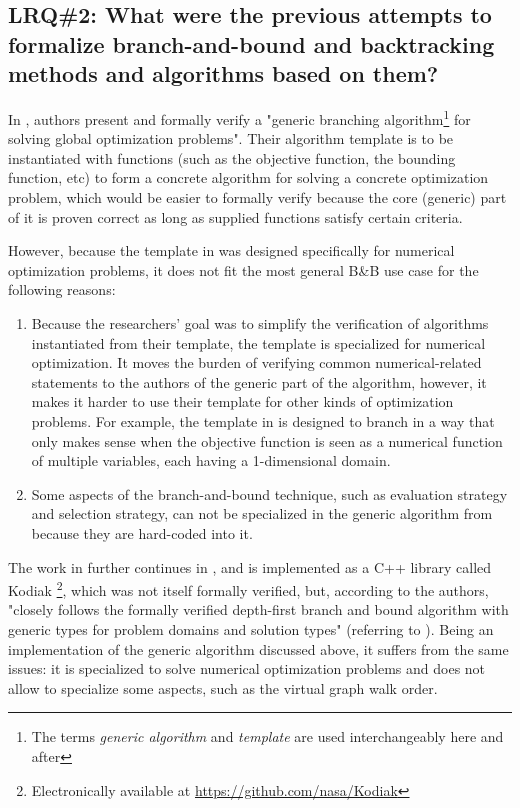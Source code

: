 \subsection{LRQ\#2: What were the previous attempts to formalize branch-and-bound and backtracking methods and algorithms based on them?}

In \cite{narkawicz2013formalnasa}, authors present and formally verify a "generic branching
algorithm\footnote{The terms \emph{generic algorithm} and \emph{template} are used interchangeably
                    here and after}
for solving global optimization problems". Their algorithm template is to be instantiated with
functions (such as the objective function, the bounding function, etc) to form a concrete
algorithm for solving a concrete optimization problem, which would be easier to formally verify
because the core (generic) part of it is proven correct as long as supplied functions
satisfy certain criteria.

However, because the template in \cite{narkawicz2013formalnasa} was designed specifically for
numerical optimization problems, it does not fit the most general B\&B use case for the following
reasons:

\begin{enumerate}
    \item Because the researchers' goal was to simplify the verification of algorithms instantiated
        from their template, the template is specialized for numerical optimization. It moves the
        burden of verifying common numerical-related statements to the authors of the generic
        part of the algorithm, however, it makes it harder to use their template for other kinds of
        optimization problems. For example, the template in \cite{narkawicz2013formalnasa}
        is designed to branch in a way that only makes sense when the objective function is seen as
        a numerical function of multiple variables, each having a 1-dimensional domain.
    \item Some aspects of the branch-and-bound technique, such as evaluation strategy
        and selection strategy, can not be specialized in the
        generic algorithm from \cite{narkawicz2013formalnasa} because they are hard-coded into it.
\end{enumerate}

The work in \cite{narkawicz2013formalnasa} further continues in \cite{smith2015rigorous},
and is implemented as a C++ library called
Kodiak \footnote{Electronically available at \url{https://github.com/nasa/Kodiak}},
which was not itself formally verified, but, according to the authors, "closely follows
the formally verified depth-first branch and bound algorithm with generic types for problem domains
and solution types" (referring to \cite{narkawicz2013formalnasa}). Being an implementation of the
generic algorithm discussed above, it suffers from the same issues: it is specialized to solve
numerical optimization problems and does not allow to specialize some aspects, such as the
virtual graph walk order.

